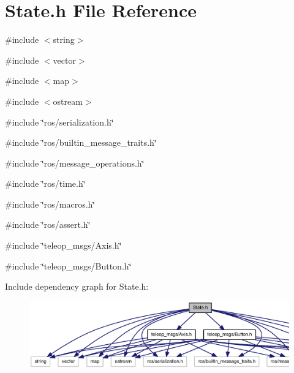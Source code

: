 \section{State.h File Reference}
\label{State_8h}
{\ttfamily \#include $<$string$>$}\par
{\ttfamily \#include $<$vector$>$}\par
{\ttfamily \#include $<$map$>$}\par
{\ttfamily \#include $<$ostream$>$}\par
{\ttfamily \#include \char`\"{}ros/serialization.h\char`\"{}}\par
{\ttfamily \#include \char`\"{}ros/builtin\_\-message\_\-traits.h\char`\"{}}\par
{\ttfamily \#include \char`\"{}ros/message\_\-operations.h\char`\"{}}\par
{\ttfamily \#include \char`\"{}ros/time.h\char`\"{}}\par
{\ttfamily \#include \char`\"{}ros/macros.h\char`\"{}}\par
{\ttfamily \#include \char`\"{}ros/assert.h\char`\"{}}\par
{\ttfamily \#include \char`\"{}teleop\_\-msgs/Axis.h\char`\"{}}\par
{\ttfamily \#include \char`\"{}teleop\_\-msgs/Button.h\char`\"{}}\par
Include dependency graph for State.h:
\nopagebreak
\begin{figure}[H]
\begin{center}
\leavevmode
\includegraphics[width=400pt]{State_8h__incl}
\end{center}
\end{figure}
